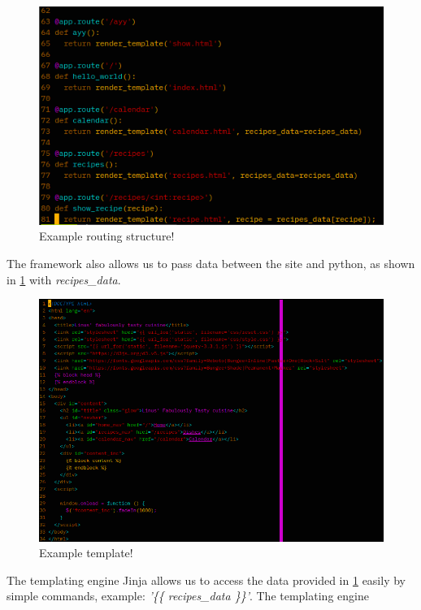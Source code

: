 \documentclass[a4paper]{scrartcl}
\begin{document}
\begin{figure}[H]
  \begin{center}
    \includegraphics[scale=0.8]{images/code_2.png}
    \caption{Example routing structure!}
    \label{fig:code_route}
  \end{center}
\end{figure}
\noindent
The framework also allows us to pass data between the site and python, as shown in
\ref{fig:code_route} with \textit{recipes\_data}.
\begin{figure}[H]
  \begin{center}
    \includegraphics[scale=0.8]{images/code_3.png}
    \caption{Example template!}
    \label{fig:code_temp}
  \end{center}
\end{figure}
\noindent
The templating engine Jinja allows us to access the data provided in \ref{fig:code_route}
easily by simple commands, example: \textit{'\{\{ recipes\_data \}\}'}. The templating engine
\end{document}
